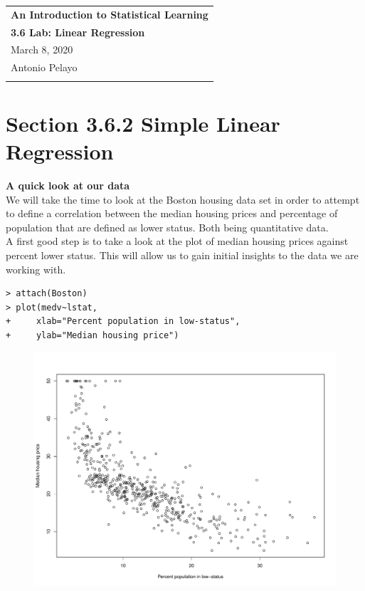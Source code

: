\documentclass{article}
\begin{document}
\thispagestyle{empty}
\begin{tabular}{p{15.5cm}}
{\large \bf An Introduction to Statistical Learning} \\
{\large \bf 3.6 Lab: Linear Regression} \\
March 8, 2020\\
Antonio Pelayo \\
\hline
\\
\end{tabular}


\section*{Section 3.6.2 Simple Linear Regression} 
{\large \bf A quick look at our data}\\
We will take the time to look at the Boston housing data set in order to 
attempt to define a correlation between the median housing prices and percentage
of population that are defined as lower status. Both being quantitative data.\\

A first good step is to take a look at the plot of median housing prices against
percent lower status. This will allow us to gain initial insights to the data we
are working with.

\begin{verbatim}
> attach(Boston)
> plot(medv~lstat, 
+     xlab="Percent population in low-status",
+     ylab="Median housing price")
\end{verbatim}
\begin{figure}[!ht]
  \centering
  \includegraphics[width=0.65\linewidth]{medv-vs-lstat.pdf}
\end{figure}
\end{document}
